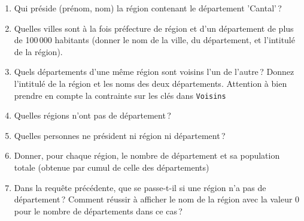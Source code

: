\begin{enumerate}
  \item Qui préside (prénom, nom) la région contenant le département 'Cantal'\,?
  
  \item Quelles villes sont à la fois préfecture de région et d'un 
  département de plus de 100\,000 habitants
  (donner le nom de la ville, du département, et l'intitulé de la région). 
  
  \item Quels départements d'une même région sont voisins l'un de l'autre\,?
     Donnez l'intitulé de la région et les noms des deux départements.
     Attention à bien prendre en compte la contrainte sur les clés
     dans \texttt{Voisins}
     
%   
   
   \item Quelles régions n'ont pas de département\,?
   
   \item Quelles personnes ne président ni région ni département\,?
   
   \item Donner, pour chaque région, le nombre de département et sa population totale (obtenue
   par cumul de celle des départements)
   
   \item Dans la requête précédente, que se passe-t-il si une
      région n'a pas de département\,? Comment réussir 
      à afficher le nom de la région avec la valeur 0 pour le nombre
      de départements dans ce cas\,?
\end{enumerate}



